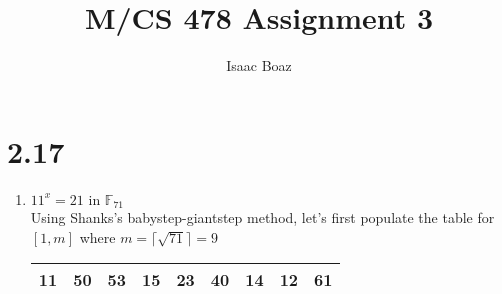 \documentclass{article}
\title{\vspace*{-4em}M/CS 478 Assignment 3}
\author{Isaac Boaz}
\begin{document}
\maketitle

\section*{2.17}
\begin{enumerate}[label=(\alph*)]
    \item \(11^x = 21 \text{ in } \mathbb{F}_{71}\) \\
          Using Shanks's babystep-giantstep method, let's first
          populate the table for \([1, m]\) where \(m = \lceil \sqrt{71} \rceil = 9\)
          \begin{center}
              \begin{tabular}{|c|c|c|c|c|c|c|c|c|}
                  \hline
                  11 & 50 & 53 & 15 & 23 & 40 & 14 & 12 & 61 \\
                  \hline
              \end{tabular}
          \end{center}


\end{enumerate}
\end{document}
